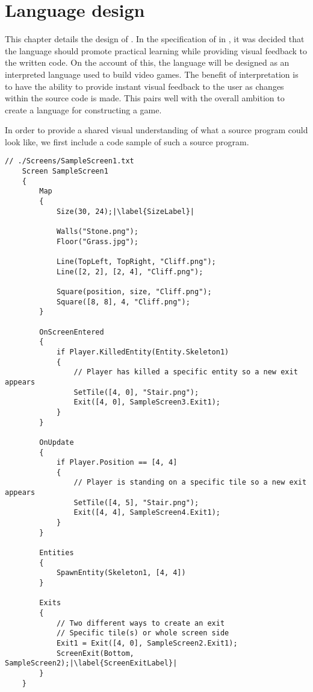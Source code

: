 \chapter{Language design}\label{chap:language_design}
This chapter details the design of \dazel. In the specification of \dazel{} in , it was decided that the language should promote practical learning while providing visual feedback to the written code. On the account of this, the \dazel{} language will be designed as an interpreted language used to build video games. The benefit of interpretation is to have the ability to provide instant visual feedback to the user as changes within the source code is made. This pairs well with the overall ambition to create a language for constructing a game.

In order to provide a shared visual understanding of what a source program could look like, we first include a code sample of such a source program.

\begin{lstlisting}[caption={Example screen.}, label={lst:SampleScreen1},escapechar=|]
    // ./Screens/SampleScreen1.txt
    Screen SampleScreen1 
    {
        Map 
        {
            Size(30, 24);|\label{SizeLabel}|
    
            Walls("Stone.png"); 
            Floor("Grass.jpg");
    
            Line(TopLeft, TopRight, "Cliff.png");
            Line([2, 2], [2, 4], "Cliff.png");
    
            Square(position, size, "Cliff.png");
            Square([8, 8], 4, "Cliff.png");
        }
    
        OnScreenEntered
        {
            if Player.KilledEntity(Entity.Skeleton1) 
            {
                // Player has killed a specific entity so a new exit appears
                SetTile([4, 0], "Stair.png");
                Exit([4, 0], SampleScreen3.Exit1);
            }
        }
    
        OnUpdate
        {
            if Player.Position == [4, 4] 
            {
                // Player is standing on a specific tile so a new exit appears
                SetTile([4, 5], "Stair.png");
                Exit([4, 4], SampleScreen4.Exit1);
            }
        }
    
        Entities
        {
            SpawnEntity(Skeleton1, [4, 4])
        }
        
        Exits 
        {
            // Two different ways to create an exit
            // Specific tile(s) or whole screen side
            Exit1 = Exit([4, 0], SampleScreen2.Exit1);
            ScreenExit(Bottom, SampleScreen2);|\label{ScreenExitLabel}|
        }
    }
    \end{lstlisting}

